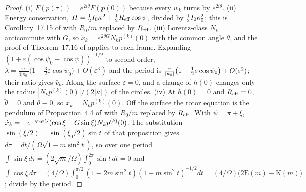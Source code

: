 \begin{proof}
(i) $F(p(\tau))=e^{2i\theta}F(p(0))$ because every $w_k$ turns by $e^{2i\theta}$. (ii) Energy conservation, $H=\tfrac12 I_0\kappa^2+\tfrac12 R_{\rm eff}\cos\psi$, divided
by $\tfrac12 I_0\kappa_0^2$; this is Corollary~17.15 of \cite{ES17} with $R_0/m$ replaced by $R_{\rm eff}$. (iii) Lorentz-class $N_k$ anticommute with $G$, so
$\dot x_k=e^{2\theta G}N_kp^{(k)}(0)$ with the common angle $\theta$, and the proof of Theorem~17.16 of \cite{ES17} applies to each frame. Expanding
$(1+\varepsilon(\cos\psi_0-\cos\psi))^{-1/2}$ to second order,
$\lambda=\frac{\pi\varepsilon}{4|\kappa_0|}\bigl(1-\tfrac32\varepsilon\cos\psi_0\bigr)+O(\varepsilon^3)$ and the period is
$\frac\pi{|\kappa_0|}\bigl(1-\tfrac12\varepsilon\cos\psi_0\bigr)+O(\varepsilon^2)$; their ratio gives $\bar v_k$. Along the surface $\varepsilon=0$, and a change
of $h(0)$ changes only the radius $|N_kp^{(k)}(0)|/(2|\kappa|)$ of the circles. (iv) At $h(0)=0$ and $R_{\rm eff}=0$, $\ddot\theta=0$ and $\theta\equiv0$, so
$\dot x_k=N_kp^{(k)}(0)$. Off the surface the rotor equation is the pendulum of Proposition~4.4 of \cite{RE} with $R_0/m$ replaced by $R_{\rm eff}$. With
$\psi=\pi+\xi$, $\dot x_k=-e^{-\varphi_{\rm eff}G}(\cos\xi+G\sin\xi)N_kp^{(k)}(0)$. The substitution $\sin(\xi/2)=\sin(\xi_0/2)\sin t$ of that
proposition gives $d\tau=dt/(\Omega\sqrt{1-m\sin^2t})$, so over one period $\int\sin\xi\,d\tau=(2\sqrt m/\Omega)\int_0^{2\pi}\sin t\,dt=0$ and
$\int\cos\xi\,d\tau=(4/\Omega)\int_0^{\pi/2}(1-2m\sin^2t)(1-m\sin^2t)^{-1/2}dt=(4/\Omega)\bigl(2\mathrm E(m)-\mathrm K(m)\bigr)$; divide by the
period.
\end{proof}

